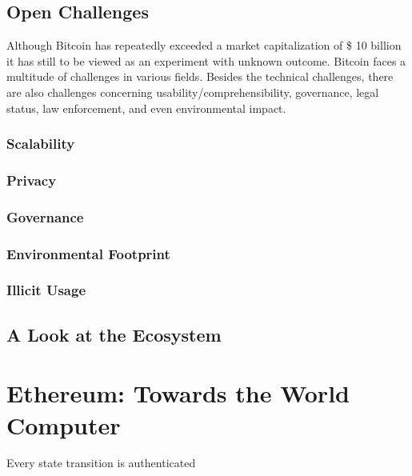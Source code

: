 \subsection{Open Challenges}
\label{sec:btc_challenges}

Although Bitcoin has repeatedly exceeded a market capitalization of \$ 10 billion it has still to be viewed as an experiment with unknown outcome. Bitcoin faces a multitude of challenges in various fields. Besides the technical challenges, there are also challenges concerning usability/comprehensibility, governance, legal status, law enforcement, and even environmental impact. 

\subsubsection{Scalability}

\subsubsection{Privacy}

\subsubsection{Governance}

\subsubsection{Environmental Footprint}

\subsubsection{Illicit Usage}


\subsection{A Look at the Ecosystem}



\section{Ethereum: Towards the World Computer}

Every state transition is authenticated 

